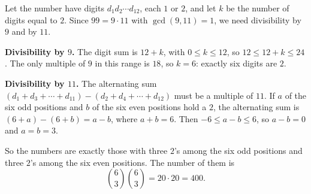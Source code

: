 Let the number have digits $d_1d_2\cdots d_{12}$, each $1$ or $2$, and let $k$ be the number of digits equal to $2$. Since $99=9\cdot11$ with $\gcd(9,11)=1$, we need divisibility by $9$ and by $11$.

\textbf{Divisibility by $9$.} The digit sum is $12+k$, with $0\le k\le12$, so $12\le12+k\le24$. The only multiple of $9$ in this range is $18$, so $k=6$: exactly six digits are $2$.

\textbf{Divisibility by $11$.} The alternating sum $(d_1+d_3+\cdots+d_{11})-(d_2+d_4+\cdots+d_{12})$ must be a multiple of $11$. If $a$ of the six odd positions and $b$ of the six even positions hold a $2$, the alternating sum is $(6+a)-(6+b)=a-b$, where $a+b=6$. Then $-6\le a-b\le6$, so $a-b=0$ and $a=b=3$.

So the numbers are exactly those with three $2$'s among the six odd positions and three $2$'s among the six even positions. The number of them is
\[\binom63\binom63=20\cdot20=\boxed{400}.\]
